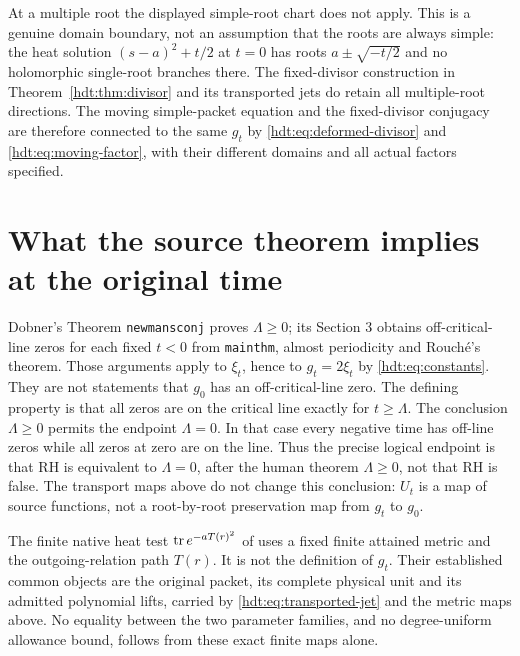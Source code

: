At a multiple root the displayed simple-root chart does not apply.
This is a genuine domain boundary, not an assumption that the roots
are always simple: the heat solution $(s-a)^2+t/2$ at $t=0$ has
roots $a\pm\sqrt{-t/2}$ and no holomorphic single-root branches
there. The fixed-divisor construction in
Theorem~\ref{hdt:thm:divisor} and its transported jets do retain all
multiple-root directions. The moving simple-packet equation and the
fixed-divisor conjugacy are therefore connected to the same $g_t$
by \eqref{hdt:eq:deformed-divisor} and \eqref{hdt:eq:moving-factor}, with
their different domains and all actual factors specified.

\section{What the source theorem implies at the original time}

Dobner's Theorem \texttt{newmansconj} proves $\Lambda\geq0$;
its Section 3 obtains off-critical-line zeros for each fixed $t<0$
from \texttt{mainthm}, almost periodicity and Rouch\'e's theorem.
Those arguments apply to $\xi_t$, hence to $g_t=2\xi_t$ by
\eqref{hdt:eq:constants}. They are not statements that $g_0$ has an
off-critical-line zero. The defining property is that all zeros
are on the critical line exactly for $t\geq\Lambda$.
The conclusion $\Lambda\geq0$ permits the endpoint $\Lambda=0$.
In that case every negative time has off-line zeros while all
zeros at zero are on the line. Thus the precise logical endpoint
is that RH is equivalent to $\Lambda=0$, after the human theorem
$\Lambda\geq0$, not that RH is false. The transport maps above
do not change this conclusion: $U_t$ is a map of source functions,
not a root-by-root preservation map from $g_t$ to $g_0$.

The finite native heat test $\operatorname{tr} e^{-aT(r)^2}$ of \cite{hdt:Native}
uses a fixed finite attained metric and the outgoing-relation path
$T(r)$. It is not the definition of $g_t$. Their established common
objects are the original packet, its complete physical unit and its
admitted polynomial lifts, carried by
\eqref{hdt:eq:transported-jet} and the metric maps above. No equality
between the two parameter families, and no degree-uniform allowance
bound, follows from these exact finite maps alone.

